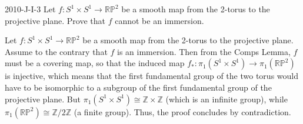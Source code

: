 \documentclass{article}
\begin{document}
	\begin{prb}{2010-J-I-3}
		Let $f: S^{1} \times S^{1} \to \mathbb{RP}^{2}$ be a smooth map from the 2-torus to the projective plane. Prove that $f$ cannot be an immersion. 
	\end{prb}
	Let $f: S^{1} \times S^{1} \to \mathbb{RP}^{2}$ be a smooth map from the 2-torus to the projective plane. Assume to the contrary that $f$ is an immersion. Then from the Comps Lemma, $f$ must be a covering map, so that the induced map $f_{\ast}: \pi_{1}(S^{1} \times S^{1}) \to \pi_{1}(\mathbb{RP}^{2})$ is injective, which means that the first fundamental group of the two torus would have to be isomorphic to a subgroup of the first fundamental group of the projective plane. But $\pi_{1}(S^{1} \times S^{1}) \cong \mathbb{Z} \times \mathbb{Z}$ (which is an infinite group), while $\pi_{1}(\mathbb{RP}^{2}) \cong \mathbb{Z}/2\mathbb{Z}$ (a finite group). Thus, the proof concludes by contradiction. 
	
\end{document}
